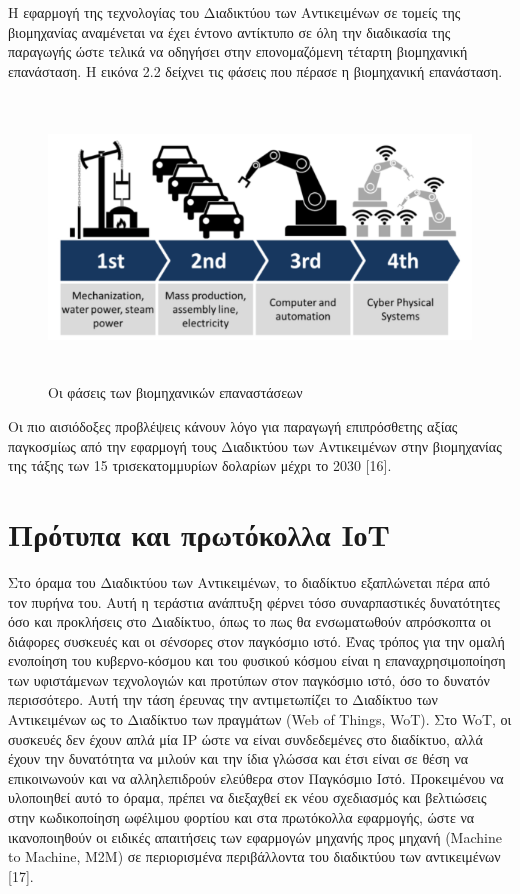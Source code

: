 Η εφαρμογή της τεχνολογίας του Διαδικτύου των Αντικειμένων σε τομείς της βιομηχανίας αναμένεται να έχει έντονο αντίκτυπο σε όλη την διαδικασία της παραγωγής ώστε τελικά να οδηγήσει στην επονομαζόμενη τέταρτη βιομηχανική επανάσταση. Η εικόνα 2.2 δείχνει τις φάσεις που πέρασε η βιομηχανική επανάσταση.

\begin{figure}[htbp]
	\centering
		\includegraphics[height=7.5cm,width=15cm]{Figures/2.png}
	\caption{Οι φάσεις των βιομηχανικών επαναστάσεων \cite{Marr} }	
\end{figure}

Οι πιο αισιόδοξες προβλέψεις κάνουν λόγο για παραγωγή επιπρόσθετης αξίας παγκοσμίως από την εφαρμογή τους Διαδι­κτύου των Αντικειμένων στην βιομηχανίας της τάξης των 15 τρισεκατομμυρίων δολαρίων μέχρι το 2030 [16].  
\section{Πρότυπα και πρωτόκολλα ΙοΤ}
Στο όραμα του Διαδικτύου των Αντικειμένων, το διαδίκτυο εξαπλώνεται πέρα από τον πυρήνα του. Αυτή η τεράστια ανάπτυ­ξη φέρνει τόσο συναρπαστικές δυνατότητες όσο και προκλήσεις στο Διαδίκτυο, όπως το πως θα ενσωματωθούν απρόσκοπτα οι διάφορες συσκευές και οι σένσορες στον παγκόσμιο ιστό. Ένας τρόπος για την ομαλή ενοποίηση του κυβερνο-κόσμου  και του φυσικού κόσμου είναι η επαναχρησιμοποίηση των υφιστάμενων τεχνολογιών και προτύπων στον παγκόσμιο ιστό, όσο το δυνατόν περισσότερο. Αυτή την τάση έρευνας την αντιμετωπίζει το Διαδί­κτυο των Αντικειμένων ως το Διαδίκτυο των πραγμάτων (Web of Things, WoT). Στο WoT, οι συσκευές δεν έχουν απλά μία ΙΡ ώστε να είναι συνδεδεμένες στο διαδίκτυο, αλλά έχουν την δυνατότητα να μιλούν και την ίδια γλώσσα και έτσι είναι σε θέση να επικοινω­νούν και να αλληλεπιδρούν ελεύθερα στον Παγκόσμιο Ιστό. Προ­κειμένου να υλοποιηθεί αυτό το όραμα, πρέπει να διεξαχθεί εκ νέου σχεδιασμός και βελτιώσεις στην κωδικοποίηση ωφέλιμου φορτίου και στα πρωτόκολλα εφαρμογής, ώστε να ικανοποιηθούν οι ειδικές απαιτήσεις των εφαρμογών μηχανής προς μηχανή (Machine to Machine, M2M) σε περιορισμένα περιβάλλοντα του διαδικτύου των αντικειμένων [17].

